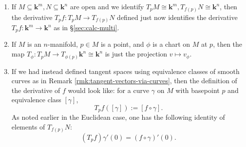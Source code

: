 \documentclass[reqno]{amsart} 
\begin{document}
\begin{remark}
  \begin{enumerate}
~
  \item   If $M \subseteq \mathbf{k}^m, N \subseteq \mathbf{k}^n$
    are open
    and we identify $T_p M \cong \mathbf{k}^m, T_{f(p)} N \cong
    \mathbf{k}^n$,
    then the derivative
    $T_p f : T_p M \rightarrow T_{f(p)} N$
    defined just now identifies the derivative
    $T_p f : \mathbf{k}^m \rightarrow \mathbf{k}^n$
    as in \S\ref{sec:calc-multi}.
  \item   
    If $M$ is an $n$-manifold,
    $p \in M$ is a point,
    and $\phi$ is a chart on $M$ at $p$,
    then the map
    $T_\phi : T_p M \rightarrow T_{\phi(p)} \mathbf{k}^n \cong  \mathbf{k}^n$
    is just the projection
    $v \mapsto v_\phi$.
  \item 
    If we had instead defined tangent spaces
    using equivalence classes of smooth curves
    as in Remark \ref{rmk:tangent-vectors-via-curves},
    then the definition of the derivative of $f$
    would look like:
    for a curve $\gamma$ on $M$ with basepoint $p$
    and equivalence class $[\gamma]$,
    \begin{equation*}
    T_p f([\gamma]) := [f \circ \gamma].
    \end{equation*}
    As noted earlier in the Euclidean case,
    one has the following identity of elements
    of $T_{f(p)} N$:
    \begin{equation*}
    (T_p f) \gamma'(0)
    =
    (f \circ \gamma)'(0).
    \end{equation*}
  \end{enumerate}
\end{remark}
\end{document}
